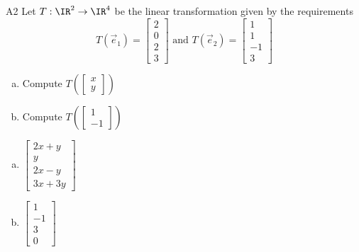 \begin{problem}{A2}
Let $T: \IR^2\rightarrow \IR^4$ be the linear transformation given by the requirements
\[ T(\vec e_1)=\begin{bmatrix}
2   \\ 0   \\ 2  \\ 3
\end{bmatrix} \text{ and }
T(\vec e_2)=\begin{bmatrix}
1   \\  1  \\ -1  \\ 3
\end{bmatrix} \]
\begin{enumerate}[(a)]
\item Compute \( T\left( \begin{bmatrix}x\\ y  \end{bmatrix} \right) \)
\item Compute \(T\left( \begin{bmatrix}  1 \\ -1 \end{bmatrix}\right)\)
\end{enumerate}
\end{problem}
\begin{solution}
\begin{enumerate}[(a)]
\item \(\begin{bmatrix} 2x+y \\ y \\ 2x-y \\ 3x+3y \end{bmatrix}\)
\item \(\begin{bmatrix} 1 \\ -1 \\ 3 \\ 0 \end{bmatrix}\)
\end{enumerate}
\end{solution}

